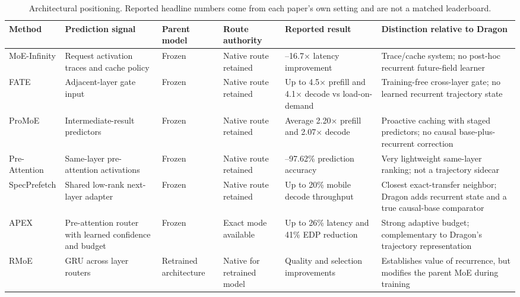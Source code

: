 \documentclass[11pt]{article}
\begin{document}
\begin{landscape}
\begin{table}[p]
\centering
\caption{Architectural positioning. Reported headline numbers come from each paper's own setting and are not a matched leaderboard.}
\label{tab:sota}
\footnotesize
\setlength{\tabcolsep}{4pt}
\renewcommand{\arraystretch}{1.15}
\begin{tabularx}{\linewidth}{>{\raggedright\arraybackslash}p{2.35cm}>{\raggedright\arraybackslash}p{3.15cm}>{\raggedright\arraybackslash}p{2.45cm}>{\raggedright\arraybackslash}p{2.55cm}>{\raggedright\arraybackslash}p{3.25cm}>{\raggedright\arraybackslash}X}
\toprule
Method & Prediction signal & Parent model & Route authority & Reported result & Distinction relative to Dragon \\
\midrule
MoE-Infinity \citep{xue2024} & Request activation traces and cache policy & Frozen & Native route retained & 3.1--16.7$\times$ latency improvement & Trace/cache system; no post-hoc recurrent future-field learner \\
FATE \citep{fang2025} & Adjacent-layer gate input & Frozen & Native route retained & Up to 4.5$\times$ prefill and 4.1$\times$ decode vs load-on-demand & Training-free cross-layer gate; no learned recurrent trajectory state \\
ProMoE \citep{song2024} & Intermediate-result predictors & Frozen & Native route retained & Average 2.20$\times$ prefill and 2.07$\times$ decode & Proactive caching with staged predictors; no causal base-plus-recurrent correction \\
Pre-Attention \citep{zhu2025} & Same-layer pre-attention activations & Frozen & Native route retained & 93.03--97.62\% prediction accuracy & Very lightweight same-layer ranking; not a trajectory sidecar \\
SpecPrefetch \citep{kong2026} & Shared low-rank next-layer adapter & Frozen & Native route retained & Up to 20\% mobile decode throughput & Closest exact-transfer neighbor; Dragon adds recurrent state and a true causal-base comparator \\
APEX \citep{kanani2026} & Pre-attention router with learned confidence and budget & Frozen & Exact mode available & Up to 26\% latency and 41\% EDP reduction & Strong adaptive budget; complementary to Dragon's trajectory representation \\
RMoE \citep{qiu2025} & GRU across layer routers & Retrained architecture & Native for retrained model & Quality and selection improvements & Establishes value of recurrence, but modifies the parent MoE during training \\

\end{tabularx}
\end{table}
\end{landscape}
\end{document}
